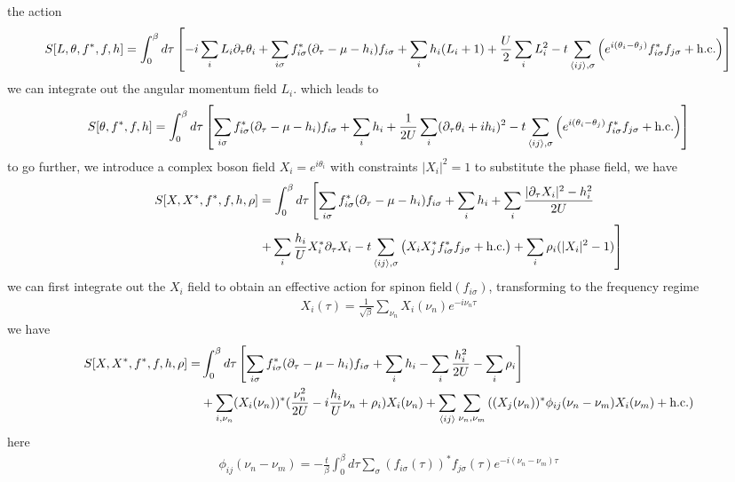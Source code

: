\documentclass{article}
\begin{document}
the action
\begin{align*}
    S[L,\theta,f^*,f,h] = \int_0^{\beta}d\tau \left[-i\sum_iL_i\partial_{\tau}\theta_i+\sum_{i\sigma}f^*_{i\sigma}(\partial_{\tau}-\mu-h_i)f_{i\sigma}+\sum_ih_i(L_i+1)+\frac{U}{2}\sum_{i}L_i^2 - t\sum_{\braket{ij},\sigma}\left(e^{i(\theta_i-\theta_j)}f_{i\sigma}^*f_{j\sigma}+\text{h.c.}\right) \right]
\end{align*}
we can integrate out the angular momentum field $L_i$. which leads to
\begin{align*}
    S[\theta,f^*,f,h] = \int_0^{\beta}d\tau\left[\sum_{i\sigma}f^*_{i\sigma}(\partial_{\tau}-\mu-h_i)f_{i\sigma}+\sum_ih_i+\frac{1}{2U}\sum_{i}(\partial_{\tau}\theta_i+ih_i)^2-t\sum_{\braket{ij},\sigma}\left(e^{i(\theta_i-\theta_j)}f_{i\sigma}^*f_{j\sigma}+\text{h.c.} \right) \right]
\end{align*}
to go further, we introduce a complex boson field $X_i = e^{i\theta_i}$ with constraints $|X_i|^2 = 1$ to substitute the phase field, we have
\begin{align*}
    S[X,X^*,f^*,f,h,\rho] &= \int_0^{\beta}d\tau\left[\sum_{i\sigma}f^*_{i\sigma}(\partial_{\tau}-\mu-h_i)f_{i\sigma}+\sum_ih_i+\sum_i\frac{|\partial_{\tau}X_i|^2-h_i^2}{2U}\right . \\&\left. +\sum_i\frac{h_i}{U}X_i^*\partial_{\tau}X_i-t\sum_{\braket{ij},\sigma}\left(X_iX_j^*f_{i\sigma}^*f_{j\sigma}+\text{h.c.}\right)+\sum_i\rho_i(|X_i|^2-1) \right]
\end{align*}
we can first integrate out the $X_i$ field to obtain an effective action for spinon field$(f_{i\sigma})$, transforming to the frequency regime
\begin{align*}
    X_{i}(\tau) = \frac{1}{\sqrt{\beta}}\sum_{\nu_n} X_i(\nu_n)e^{-i\nu_n\tau}
\end{align*}
we have
\begin{align*}
    S[X,X^*,f^*,f,h,\rho] = &\int_0^{\beta}d\tau \left[\sum_{i\sigma}f_{i\sigma}^*(\partial_{\tau}-\mu-h_i)f_{i\sigma}+\sum_ih_i-\sum_i\frac{h_i^2}{2U}-\sum_i\rho_i\right]\\&+\sum_{i,\nu_n}(X_i(\nu_n))^*(\frac{\nu_n^2}{2U}-i\frac{h_i}{U}\nu_n+\rho_i)X_i(\nu_n)+\sum_{\braket{ij}}\sum_{\nu_n,\nu_m}\left((X_{j}(\nu_n))^*\phi_{ij}(\nu_n-\nu_m)X_{i}(\nu_m)+\text{h.c.}\right)
\end{align*}
here
\begin{align*}
    \phi_{ij}(\nu_n-\nu_m) = -\frac{t}{\beta}\int_0^{\beta}d\tau \sum_{\sigma}(f_{i\sigma}(\tau))^*f_{j\sigma}(\tau)e^{-i(\nu_n-\nu_m)\tau}
\end{align*}
\end{document}
